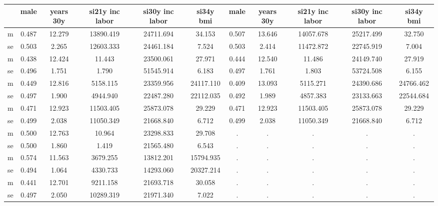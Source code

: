 \begin{table}[htbp]
\begin{tabular}{lcccccccccc} \hline \hline
 & male  & years 30y  & si21y inc labor  & si30y inc labor  & si34y bmi  & male  & years 30y  & si21y inc labor  & si30y inc labor  & si34y bmi  \\  \hline 
m &     0.487 &    12.279 & 13890.419 & 24711.694 &    34.153 &     0.507 &    13.646 & 14057.678 & 25217.499 &    32.750 \\  
se &     0.503 &     2.265 & 12603.333 & 24461.184 &     7.524 &     0.503 &     2.414 & 11472.872 & 22745.919 &     7.004 \\  
m &     0.438 &    12.424 &    11.443 & 23500.061 &    27.971 &     0.444 &    12.540 &    11.486 & 24149.740 &    27.919 \\  
se &     0.496 &     1.751 &     1.790 & 51545.914 &     6.183 &     0.497 &     1.761 &     1.803 & 53724.508 &     6.155 \\  
m &     0.449 &    12.816 &  5158.115 & 23359.956 & 24117.110 &     0.409 &    13.093 &  5115.271 & 24390.686 & 24766.462 \\  
se &     0.497 &     1.900 &  4944.940 & 22487.280 & 22112.035 &     0.492 &     1.989 &  4857.383 & 23133.663 & 22544.684 \\  
m &     0.471 &    12.923 & 11503.405 & 25873.078 &    29.229 &     0.471 &    12.923 & 11503.405 & 25873.078 &    29.229 \\  
se &     0.499 &     2.038 & 11050.349 & 21668.840 &     6.712 &     0.499 &     2.038 & 11050.349 & 21668.840 &     6.712 \\  
m &     0.500 &    12.763 &    10.964 & 23298.833 &    29.708 &         . &         . &         . &         . &         . \\  
se &     0.500 &     1.860 &     1.419 & 21565.480 &     6.543 &         . &         . &         . &         . &         . \\  
m &     0.574 &    11.563 &  3679.255 & 13812.201 & 15794.935 &         . &         . &         . &         . &         . \\  
se &     0.494 &     1.064 &  4330.733 & 14293.060 & 20327.214 &         . &         . &         . &         . &         . \\  
m &     0.441 &    12.701 &  9211.158 & 21693.718 &    30.058 &         . &         . &         . &         . &         . \\  
se &     0.497 &     2.050 & 10289.319 & 21971.340 &     7.022 &         . &         . &         . &         . &         . \\  
\hline \hline \end{tabular}
\end{table}
